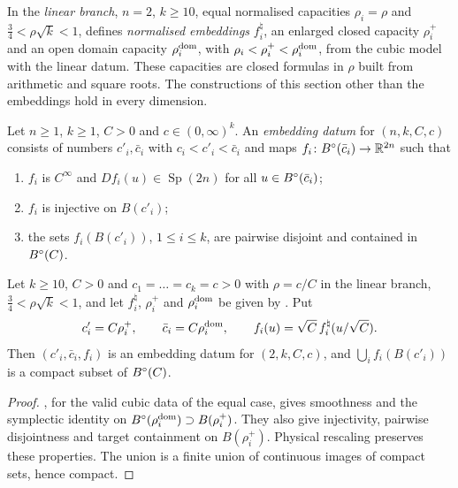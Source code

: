 In the \emph{linear branch}, $n=2$, $k\ge10$, equal normalised capacities $\rho_i=\rho$ and $\frac34<\rho\sqrt k<1$,
 defines \emph{normalised embeddings} $f^\natural_i$, an enlarged closed capacity
$\rho_i^+$ and an open domain capacity $\rho_i^{\rm dom}$, with $\rho_i<\rho_i^+<\rho_i^{\rm dom}$, from the cubic model
with the linear datum. These capacities are closed formulas in $\rho$ built from arithmetic and square roots. The
constructions of this section other than the embeddings hold in every dimension.

\begin{definition}\label{def:ham-datum}
Let $n\ge1$, $k\ge1$, $C>0$ and $c\in(0,\infty)^k$. An \emph{embedding datum} for $(n,k,C,c)$ consists of numbers
$c'_i,\bar c_i$ with $c_i<c'_i<\bar c_i$ and maps $f_i\colon B^{\circ}(\bar c_i)\to\mathbb{R}^{2n}$ such that
\begin{enumerate}[label=(\roman*)]
\item $f_i$ is $C^\infty$ and $Df_i(u)\in\operatorname{Sp}(2n)$ for all $u\in B^{\circ}(\bar c_i)$;
\item $f_i$ is injective on $B(c'_i)$;
\item the sets $f_i(B(c'_i))$, $1\le i\le k$, are pairwise disjoint and contained in $B^{\circ}(C)$.
\end{enumerate}
\end{definition}

\begin{proposition}\label{prop:ham-embeddings}
Let $k\ge10$, $C>0$ and $c_1=\dots=c_k=c>0$ with $\rho=c/C$ in the linear branch, $\frac34<\rho\sqrt k<1$, and let
$f^\natural_i$, $\rho_i^+$ and $\rho_i^{\rm dom}$ be given by . Put
\[
 c'_i=C\rho_i^+,\qquad \bar c_i=C\rho_i^{\rm dom},\qquad f_i(u)=\sqrt C\,f^\natural_i(u/\sqrt C).
\]
Then $(c'_i,\bar c_i,f_i)$ is an embedding datum for $(2,k,C,c)$, and $\bigcup_if_i(B(c'_i))$ is a compact subset of
$B^{\circ}(C)$.
\end{proposition}

\begin{proof}
, for the valid cubic data of the equal case, gives smoothness and the symplectic identity on $B^{\circ}(\rho_i^{\rm dom})\supset B(\rho_i^+)$. They also give injectivity, pairwise disjointness and target containment on $B(\rho_i^+)$. Physical rescaling preserves these properties. The union is a finite union of continuous images of compact sets, hence compact.
\end{proof}

